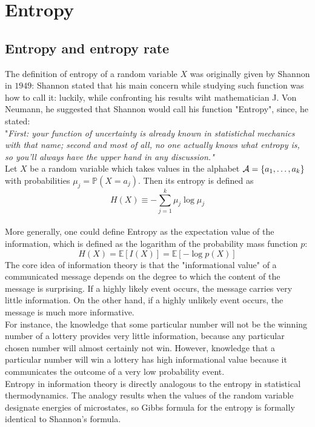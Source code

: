 \chapter{Entropy}

\section{Entropy and entropy rate}
The definition of entropy of a random variable $X$ was originally given by Shannon in $1949$: Shannon stated that his main concern while studying such function was how to call it: luckily, while confronting his results wiht mathematician J. Von Neumann, he suggested that Shannon would call his function "Entropy", since, he stated:
\\"\textit{First: your function of uncertainty is already known in statistichal mechanics with that name; second and most of all, no one actually knows what entropy is, so you'll always have the upper hand in any discussion."}
\\Let $X$ be a random variable which takes values in the alphabet $\mathcal{A}=\{ a_1, \dots, a_k \}$ with probabilities $\mu_j = \mathbb{P} (X=a_j)$. Then its entropy is defined as 
\begin{equation}
    \label{eq:entropy_def}
    H(X) \equiv -  \sum_{j=1}^k \mu_j \log \mu_j
\end{equation}
\\More generally, one could define Entropy as the expectation value of the information, which is defined as the logarithm of the probability mass function $p$:
\begin{equation*}
    H(X) = \mathbb{E}[I(X)] = \mathbb{E}[-\log p(X)]
\end{equation*}
The core idea of information theory is that the "informational value" of a communicated message depends on the degree to which the content of the message is surprising. If a highly likely event occurs, the message carries very little information. On the other hand, if a highly unlikely event occurs, the message is much more informative. 
\\For instance, the knowledge that some particular number will not be the winning number of a lottery provides very little information, because any particular chosen number will almost certainly not win. However, knowledge that a particular number will win a lottery has high informational value because it communicates the outcome of a very low probability event.
\\Entropy in information theory is directly analogous to the entropy in statistical thermodynamics. The analogy results when the values of the random variable designate energies of microstates, so Gibbs formula for the entropy is formally identical to Shannon's formula.

